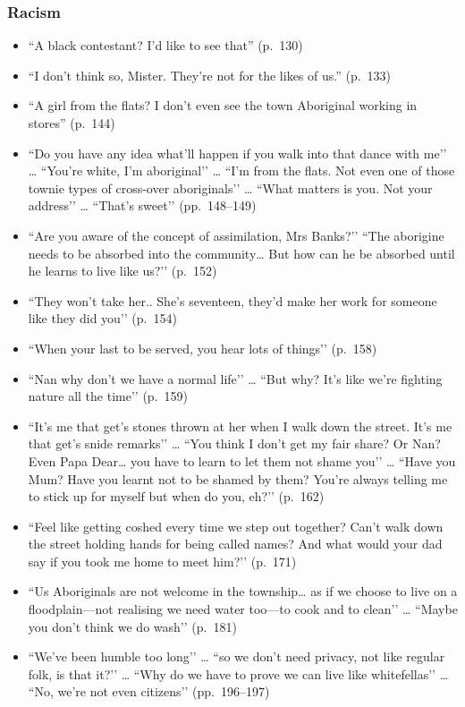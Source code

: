 \documentclass[a4paper]{article}
\begin{document}
\subsubsection{Racism}
\begin{itemize}
    \item ``A black contestant? I’d like to see that'' (p.~130)
    \item ``I don’t think so, Mister. They’re not for the likes of us.'' (p.~133)
    \item ``A girl from the flats? I don’t even see the town Aboriginal working in stores'' (p.~144)
    \item ``Do you have any idea what’ll happen if you walk into that dance with me’’ … “You’re white, I’m aboriginal’’ … “I’m from the flats. Not even one of those townie types of cross-over aboriginals’’ … “What matters is you. Not your address’’ … “That’s sweet’’ (pp.~148--149)
    \item ``Are you aware of the concept of assimilation, Mrs Banks?’’  
    ``The aborigine needs to be absorbed into the community… But how can he be absorbed until he learns to live like us?’’ (p.~152)
    \item ``They won’t take her.. She’s seventeen, they’d make her work for someone like they did you’’ (p.~154)
    \item ``When your last to be served, you hear lots of things’’ (p.~158)
    \item ``Nan why don’t we have a normal life’’ … ``But why? It’s like we’re fighting nature all the time’’ (p.~159)
    \item ``It’s me that get’s stones thrown at her when I walk down the street. It’s me that get’s snide remarks’’ … ``You think I don’t get my fair share? Or Nan? Even Papa Dear… you have to learn to let them not shame you’’ … ``Have you Mum? Have you learnt not to be shamed by them? You’re always telling me to stick up for myself but when do you, eh?’’ (p.~162)
    \item ``Feel like getting coshed every time we step out together? Can’t walk down the street holding hands for being called names? And what would your dad say if you took me home to meet him?’’ (p.~171)
    \item ``Us Aboriginals are not welcome in the township… as if we choose to live on a floodplain—not realising we need water too—to cook and to clean’’ … ``Maybe you don’t think we do wash’’ (p.~181)
    \item ``We’ve been humble too long’’ … ``so we don’t need privacy, not like regular folk, is that it?’’ … ``Why do we have to prove we can live like whitefellas’’ … ``No, we’re not even citizens’’ (pp.~196--197)
\end{itemize}
\end{document}
